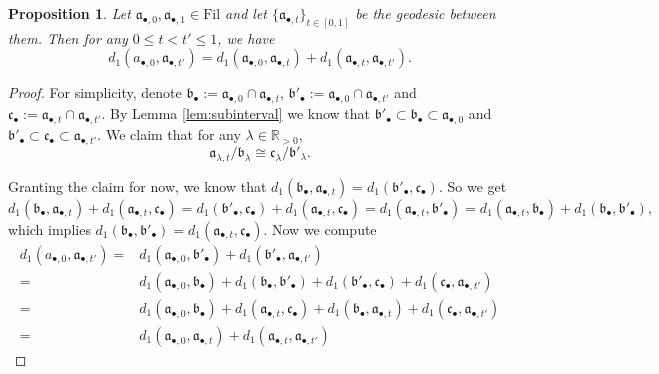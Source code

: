 \documentclass[10pt,a4paper]{amsart}
\newtheorem{proposition}{Proposition}
\newcommand{\Fil}{\mathrm{Fil}}
\newcommand{\bR}{\mathbb{R}}
\newcommand{\fa}{\mathfrak{a}}
\newcommand{\fb}{\mathfrak{b}}
\newcommand{\fc}{\mathfrak{c}}
\begin{document}
\begin{proposition}\label{prop:distance minimizing}
    Let $\fa_{\bullet,0},\fa_{\bullet,1}\in\Fil$ and let $\{\fa_{\bullet,t}\}_{t\in[0,1]}$ be the geodesic between them. Then for any $0\le t<t'\le 1$, we have
    \begin{equation}\label{eqn:distance minimizing}
        d_1(a_{\bullet,0},\fa_{\bullet,t'})=
        d_1(\fa_{\bullet,0},\fa_{\bullet,t})+
        d_1(\fa_{\bullet,t},\fa_{\bullet,t'}).
    \end{equation}
\end{proposition}

\begin{proof}
    For simplicity, denote $\fb_\bullet:=\fa_{\bullet,0}\cap\fa_{\bullet,t}$, $\fb'_\bullet:=\fa_{\bullet,0}\cap\fa_{\bullet,t'}$ and $\fc_\bullet:=\fa_{\bullet,t}\cap\fa_{\bullet,t'}$. By Lemma \ref{lem:subinterval} we know that $\fb'_\bullet\subset\fb_\bullet\subset\fa_{\bullet,0}$ and $\fb'_\bullet\subset\fc_\bullet\subset\fa_{\bullet,t'}$. We claim that for any $\lambda\in\bR_{>0}$, 
    \begin{equation}\label{eqn:parallelogram}
        \fa_{\lambda,t}/\fb_\lambda\cong \fc_\lambda/\fb'_\lambda.
    \end{equation}
	
    Granting the claim for now, we know that $d_1(\fb_\bullet,\fa_{\bullet,t})=d_1(\fb'_\bullet,\fc_\bullet)$. So we get
    \[
        d_1(\fb_\bullet,\fa_{\bullet,t})+
        d_1(\fa_{\bullet,t},\fc_\bullet)=
        d_1(\fb'_\bullet,\fc_\bullet)+
        d_1(\fa_{\bullet,t},\fc_\bullet)
        =d_1(\fa_{\bullet,t},\fb'_\bullet)
        =d_1(\fa_{\bullet,t},\fb_\bullet)+
        d_1(\fb_\bullet,\fb'_\bullet),
    \]
    which implies $d_1(\fb_\bullet,\fb'_\bullet)=d_1(\fa_{\bullet,t},\fc_\bullet)$. Now we compute
    \begin{align*}
        d_1(a_{\bullet,0},\fa_{\bullet,t'})=
        &d_1(\fa_{\bullet,0},\fb'_\bullet)+
        d_1(\fb'_\bullet,\fa_{\bullet,t'})\\
        =&d_1(\fa_{\bullet,0},\fb_\bullet)+d_1(\fb_\bullet,\fb'_\bullet)+d_1(\fb'_\bullet,\fc_\bullet)+d_1(\fc_\bullet,\fa_{\bullet,t'})\\
        =&d_1(\fa_{\bullet,0},\fb_\bullet)+d_1(\fa_{\bullet,t},\fc_\bullet)+d_1(\fb_\bullet,\fa_{\bullet,t})+d_1(\fc_\bullet,\fa_{\bullet,t'})\\
        =&d_1(\fa_{\bullet,0},\fa_{\bullet,t})+d_1(\fa_{\bullet,t},\fa_{\bullet,t'})
        \end{align*}
	

\end{proof}
\end{document}
